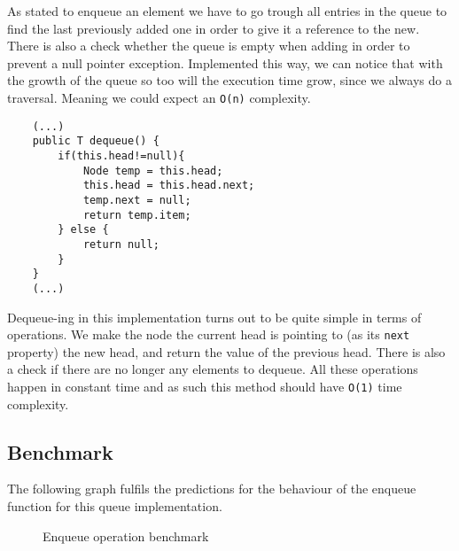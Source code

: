 \documentclass[a4paper,11pt]{article}
\begin{document}
As stated to enqueue an element we have to go trough all entries in the queue to find the last previously added one in order to give it a reference to the new. There is also a check whether the queue is empty when adding in order to prevent a null pointer exception. Implemented this way, we can notice that with the growth of the queue so too will the execution time grow, since we always do a traversal. Meaning we could expect an {\tt O(n)} complexity.  

\begin{verbatim}
    (...)
    public T dequeue() {
        if(this.head!=null){
            Node temp = this.head;
            this.head = this.head.next;
            temp.next = null;
            return temp.item;
        } else {
            return null;
        }
    }
    (...)
\end{verbatim}

Dequeue-ing in this implementation turns out to be quite simple in terms of operations. We make the node the current head is pointing to (as its {\tt next} property) the new head, and return the value of the previous head. There is also a check if there are no longer any elements to dequeue. All these operations happen in constant time and as such this method should have {\tt O(1)} time complexity.

\subsection*{Benchmark}

The following graph fulfils the predictions for the behaviour of the enqueue function for this queue implementation.

\begin{figure}[H]
    \centering
    \caption{Enqueue operation benchmark}
    \label{fig:plot1}
\end{figure}
\end{document}
